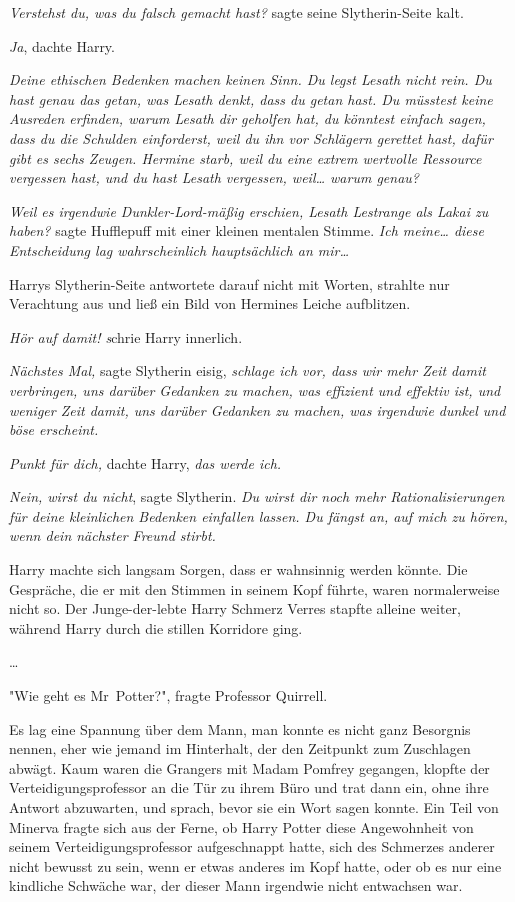 {\emph{Verstehst du, was du falsch gemacht hast?} sagte seine Slytherin-Seite kalt.

\emph{Ja}, dachte Harry.

\emph{Deine ethischen Bedenken machen keinen Sinn. Du legst Lesath nicht rein. Du hast genau das getan, was Lesath denkt, dass du getan hast. Du müsstest keine Ausreden erfinden, warum Lesath dir geholfen hat, du könntest einfach sagen, dass du die Schulden einforderst, weil du ihn vor Schlägern gerettet hast, dafür gibt es sechs Zeugen. Hermine starb, weil du eine extrem wertvolle Ressource vergessen hast, und du hast Lesath vergessen, weil… warum genau?}

\emph{Weil es irgendwie Dunkler-Lord-mäßig erschien, Lesath Lestrange als Lakai zu haben?} sagte Hufflepuff mit einer kleinen mentalen Stimme. \emph{Ich meine… diese Entscheidung lag wahrscheinlich hauptsächlich an mir…}

Harrys Slytherin-Seite antwortete darauf nicht mit Worten, strahlte nur Verachtung aus und ließ ein Bild von Hermines Leiche aufblitzen.

\emph{Hör auf damit! s}chrie Harry innerlich.

\emph{Nächstes Mal,} sagte Slytherin eisig, \emph{schlage ich vor, dass wir mehr Zeit damit verbringen, uns darüber Gedanken zu machen, was effizient und effektiv ist, und weniger Zeit damit, uns darüber Gedanken zu machen, was irgendwie dunkel und böse erscheint.}

\emph{Punkt für dich,} dachte Harry, \emph{das werde ich.}

\emph{Nein, wirst du nicht}, sagte Slytherin. \emph{Du wirst dir noch mehr Rationalisierungen für deine kleinlichen Bedenken einfallen lassen. Du fängst an, auf mich zu hören, wenn dein nächster Freund stirbt.}

Harry machte sich langsam Sorgen, dass er wahnsinnig werden könnte. Die Gespräche, die er mit den Stimmen in seinem Kopf führte, waren normalerweise nicht so. Der Junge-der-lebte Harry Schmerz Verres stapfte alleine weiter, während Harry durch die stillen Korridore ging.

…

"Wie geht es Mr~Potter?", fragte Professor Quirrell.

Es lag eine Spannung über dem Mann, man konnte es nicht ganz Besorgnis nennen, eher wie jemand im Hinterhalt, der den Zeitpunkt zum Zuschlagen abwägt. Kaum waren die Grangers mit Madam Pomfrey gegangen, klopfte der Verteidigungsprofessor an die Tür zu ihrem Büro und trat dann ein, ohne ihre Antwort abzuwarten, und sprach, bevor sie ein Wort sagen konnte. Ein Teil von Minerva fragte sich aus der Ferne, ob Harry Potter diese Angewohnheit von seinem Verteidigungsprofessor aufgeschnappt hatte, sich des Schmerzes anderer nicht bewusst zu sein, wenn er etwas anderes im Kopf hatte, oder ob es nur eine kindliche Schwäche war, der dieser Mann irgendwie nicht entwachsen war.

}
